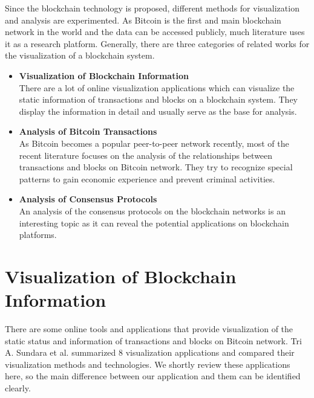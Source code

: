 Since the blockchain technology is proposed, different methods for visualization and analysis are experimented. As Bitcoin is the first and main blockchain network in the world and the data can be accessed publicly, much literature uses it as a research platform. Generally, there are three categories of related works for the visualization of a blockchain system.
\begin{itemize}
    \item \textbf{Visualization of Blockchain Information} \\
        There are a lot of online visualization applications which can visualize the static information of transactions and blocks on a blockchain system. They display the information in detail and usually serve as the base for analysis.
    \item \textbf{Analysis of Bitcoin Transactions} \\
        As Bitcoin becomes a popular peer-to-peer network recently, most of the recent literature focuses on the analysis of the relationships between transactions and blocks on Bitcoin network. They try to recognize special patterns to gain economic experience and prevent criminal activities.
    \item \textbf{Analysis of Consensus Protocols} \\
        An analysis of the consensus protocols on the blockchain networks is an interesting topic as it can reveal the potential applications on blockchain platforms.
\end{itemize}

\section{Visualization of Blockchain Information}

There are some online tools and applications that provide visualization of the static status and information of transactions and blocks on Bitcoin network. Tri A. Sundara et al. \cite{Sundara2017} summarized 8 visualization applications and compared their visualization methods and technologies. We shortly review these applications here, so the main difference between our application and them can be identified clearly.
\clearpage

